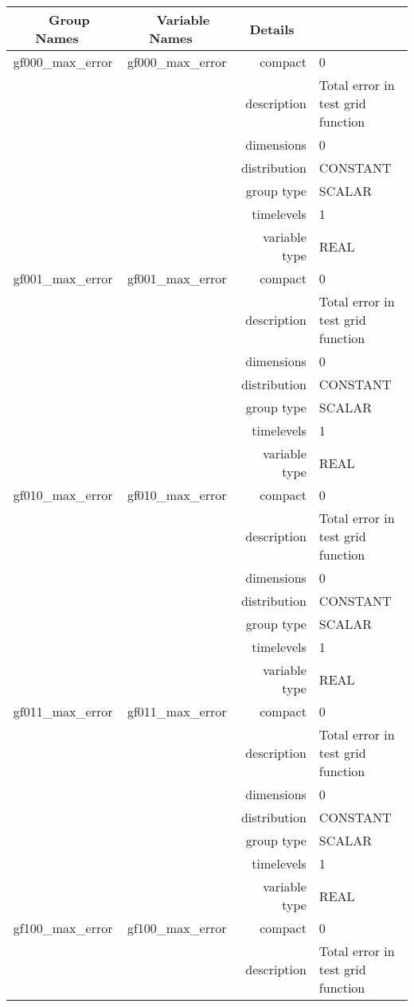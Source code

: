 \begin{tabular*}{150mm}{|c|c@{\extracolsep{\fill}}|rl|} \hline 
~ {\bf Group Names} ~ & ~ {\bf Variable Names} ~  &{\bf Details} ~ & ~ \\ 
\hline 
gf000\_max\_error & gf000\_max\_error & compact & 0 \\ 
 &  & description & Total error in test grid function \\ 
 &  & dimensions & 0 \\ 
 &  & distribution & CONSTANT \\ 
 &  & group type & SCALAR \\ 
 &  & timelevels & 1 \\ 
 &  & variable type & REAL \\ 
\hline 
gf001\_max\_error & gf001\_max\_error & compact & 0 \\ 
 &  & description & Total error in test grid function \\ 
 &  & dimensions & 0 \\ 
 &  & distribution & CONSTANT \\ 
 &  & group type & SCALAR \\ 
 &  & timelevels & 1 \\ 
 &  & variable type & REAL \\ 
\hline 
gf010\_max\_error & gf010\_max\_error & compact & 0 \\ 
 &  & description & Total error in test grid function \\ 
 &  & dimensions & 0 \\ 
 &  & distribution & CONSTANT \\ 
 &  & group type & SCALAR \\ 
 &  & timelevels & 1 \\ 
 &  & variable type & REAL \\ 
\hline 
gf011\_max\_error & gf011\_max\_error & compact & 0 \\ 
 &  & description & Total error in test grid function \\ 
 &  & dimensions & 0 \\ 
 &  & distribution & CONSTANT \\ 
 &  & group type & SCALAR \\ 
 &  & timelevels & 1 \\ 
 &  & variable type & REAL \\ 
\hline 
gf100\_max\_error & gf100\_max\_error & compact & 0 \\ 
 &  & description & Total error in test grid function \\ 

\end{tabular*}
